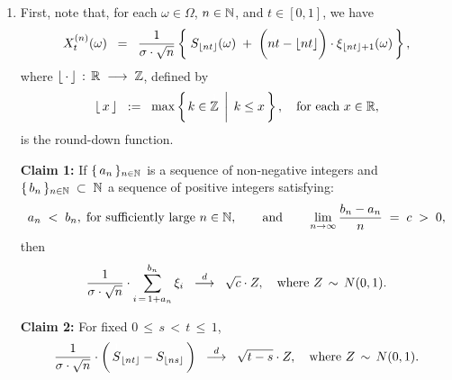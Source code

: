 \begin{enumerate}
\item	First, note that, for each $\omega \in \Omega$, $n \in\mathbb{N}$, and $t \in [0,1]$, we have
		\begin{equation*}
		X^{(n)}_{t}(\omega)
		\;\; = \;\;
		\dfrac{1}{\sigma\cdot\sqrt{n}}
		\left\{\;
		S_{\lfloor nt \rfloor}(\omega) \;+\; \left(\overset{{\color{white}1}}{nt} - \lfloor nt \rfloor\right)\cdot\xi_{\lfloor nt \rfloor+1}(\omega)
		\,\right\},
		\end{equation*}
		where $\lfloor\,\cdot\,\rfloor\,:\,\mathbb{R}\;\longrightarrow\;\mathbb{Z}$, defined by
		\begin{equation*}
		\lfloor\,x\,\rfloor
		\;\;:=\;\;
		\max\left\{
		\left. k \in \overset{{\color{white}1}}{\Z} \,\;\right\vert\; k \leq x
		\,\right\},
		\quad
		\textnormal{for each $x \in \Re$},
		\end{equation*}
		is the round-down function.

		\vskip 0.5cm
		\begin{center}
		\begin{minipage}{6.0in}
		\noindent
		\textbf{Claim 1:}\quad
		If \;$\{\,a_{n}\,\}_{n\in\mathbb{N}}$\; is a sequence of non-negative integers and
		\;$\{\,b_{n}\,\}_{n\in\mathbb{N}} \;\subset\; \mathbb{N}$\; a sequence of positive integers
		satisfying:
		\begin{equation*}
		a_{n} \;<\; b_{n}, \;\textnormal{for sufficiently large $n\in\mathbb{N}$},
		\quad\quad
		\textnormal{and}
		\quad\quad
		\lim_{n\rightarrow\infty}\dfrac{b_{n} - a_{n}}{n} \;=\; c \;>\; 0,
		\end{equation*}
		then
		\begin{equation*}
		\dfrac{1}{\sigma\cdot\sqrt{n}}\cdot\sum_{i\,=\,1+a_{n}}^{b_{n}}\xi_{i}
		\;\; \overset{d}{\longrightarrow} \;\;
		\sqrt{c}\cdot Z,
		\quad
		\textnormal{where $Z\,\sim\,N(0,1)$}.
		\end{equation*}
		\end{minipage}
		\end{center}

		\vskip 0.5cm
		\begin{center}
		\begin{minipage}{6.0in}
		\noindent
		\textbf{Claim 2:}
		\quad For fixed $0 \,\leq\, s \,<\, t \,\leq\, 1$,
		\begin{equation*}
		\dfrac{1}{\sigma\cdot\sqrt{n}}
		\cdot
		\left(\,\overset{{\color{white}1}}{S}_{\lfloor nt \rfloor} - S_{\lfloor ns \rfloor}\,\right)
		\;\; \overset{d}{\longrightarrow} \;\;
		\sqrt{t - s}\cdot Z,
		\quad
		\textnormal{where $Z\,\sim\,N(0,1)$}.
		\end{equation*}
		\end{minipage}
		\end{center}


\end{enumerate}
